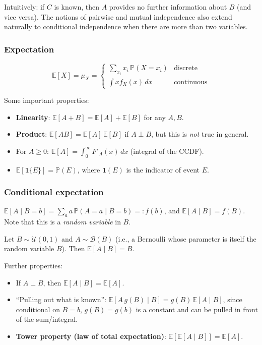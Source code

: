 Intuitively: if $C$ is known, then $A$ provides no further information about $B$ (and vice versa). The notions of pairwise and mutual independence also extend naturally to conditional independence when there are more than two variables.

\subsubsection*{Expectation}

\[
\mathbb{E}[X] = \mu_X = \begin{cases} \sum_{x_i} x_i\, \mathbb{P}(X = x_i) & \text{discrete} \\ \int x f_X(x)\, dx & \text{continuous} \end{cases}
\]

Some important properties:
\begin{itemize}
    \item \textbf{Linearity}: $\mathbb{E}[A + B] = \mathbb{E}[A] + \mathbb{E}[B]$ for any $A, B$.
    \item \textbf{Product}: $\mathbb{E}[AB] = \mathbb{E}[A]\,\mathbb{E}[B]$ if $A \perp B$, but this is \emph{not} true in general.
    \item For $A \geq 0$: $\mathbb{E}[A] = \int_0^\infty F'_A(x)\, dx$ (integral of the CCDF).
    \item $\mathbb{E}[\mathbf{1}\{E\}] = \mathbb{P}(E)$, where $\mathbf{1}(E)$ is the indicator of event $E$.
\end{itemize}

\subsubsection*{Conditional expectation}

\begin{definition}
$\mathbb{E}[A \mid B = b] = \sum_a a\, \mathbb{P}(A = a \mid B = b) =: f(b)$, and $\mathbb{E}[A \mid B] = f(B)$. Note that this is a \emph{random variable} in $B$.
\end{definition}

\begin{example}
Let $B \sim \mathcal{U}(0,1)$ and $A \sim \mathcal{B}(B)$ (i.e., a Bernoulli whose parameter is itself the random variable $B$). Then $\mathbb{E}[A \mid B] = B$.
\end{example}

Further properties:
\begin{itemize}
    \item If $A \perp B$, then $\mathbb{E}[A \mid B] = \mathbb{E}[A]$.
    \item ``Pulling out what is known'': $\mathbb{E}[A\, g(B) \mid B] = g(B)\, \mathbb{E}[A \mid B]$, since conditional on $B = b$, $g(B) = g(b)$ is a constant and can be pulled in front of the sum/integral.
    \item \textbf{Tower property (law of total expectation)}: $\mathbb{E}[\mathbb{E}[A \mid B]] = \mathbb{E}[A]$.
\end{itemize}

